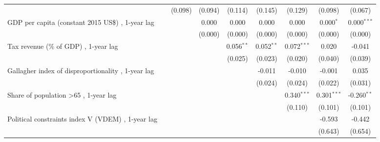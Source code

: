 \begin{table}[htbp]
\begin{tabular}{lcccccccc}
                                                                                                           &         & (0.098)     & (0.094) & (0.114)      & (0.145)      & (0.129)       & (0.098)       & (0.067)\\   
      GDP per capita (constant 2015 US\$) , 1-year lag                                                     &         &             & 0.000   & 0.000        & 0.000        & 0.000         & 0.000$^{*}$   & 0.000$^{***}$\\   
                                                                                                           &         &             & (0.000) & (0.000)      & (0.000)      & (0.000)       & (0.000)       & (0.000)\\   
      Tax revenue (\% of GDP) , 1-year lag                                                                 &         &             &         & 0.056$^{**}$ & 0.052$^{**}$ & 0.072$^{***}$ & 0.020         & -0.041\\   
                                                                                                           &         &             &         & (0.025)      & (0.023)      & (0.020)       & (0.040)       & (0.039)\\   
      Gallagher index of disproportionality , 1-year lag                                                   &         &             &         &              & -0.011       & -0.010        & -0.001        & 0.035\\   
                                                                                                           &         &             &         &              & (0.024)      & (0.024)       & (0.022)       & (0.031)\\   
      Share of population >65 , 1-year lag                                                                 &         &             &         &              &              & 0.340$^{***}$ & 0.301$^{***}$ & -0.260$^{**}$\\   
                                                                                                           &         &             &         &              &              & (0.110)       & (0.101)       & (0.101)\\   
      Political constraints index V (VDEM) , 1-year lag                                                    &         &             &         &              &              &               & -0.593        & -0.442\\   
                                                                                                           &         &             &         &              &              &               & (0.643)       & (0.654)\\   

\end{tabular}
\end{table}
